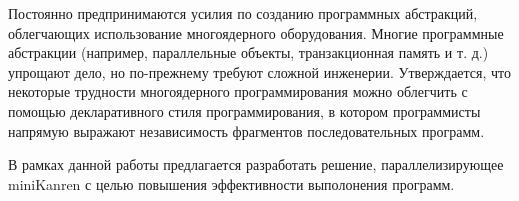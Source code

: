 

Постоянно предпринимаются усилия по созданию программных
абстракций, облегчающих использование многоядерного оборудования.
Многие программные абстракции (например, параллельные объекты, 
транзакционная память и т. д.) упрощают дело, но по-прежнему 
требуют сложной инженерии. Утверждается, что некоторые трудности 
многоядерного программирования можно облегчить с помощью 
декларативного стиля программирования, в котором 
программисты напрямую выражают независимость фрагментов 
последовательных программ.

В рамках данной работы предлагается разработать решение,
параллелизирующее miniKanren с целью повышения 
эффективности выполонения программ.

